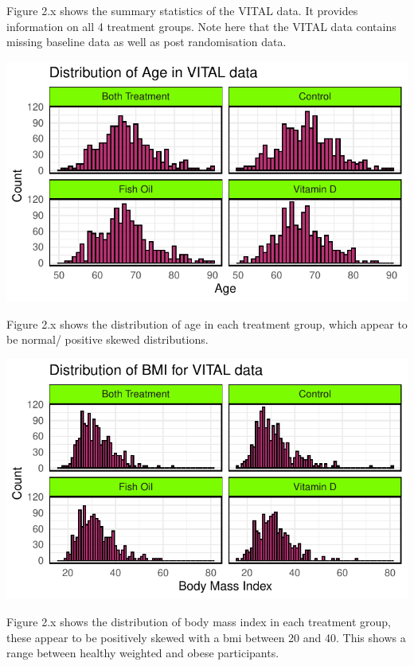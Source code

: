 \documentclass{article}
\begin{document}
Figure 2.x shows the summary statistics of the VITAL data. It provides
information on all 4 treatment groups. Note here that the VITAL data
contains missing baseline data as well as post randomisation data.

\begin{center}\includegraphics{Final_Report_files/figure-latex/unnamed-chunk-11-1} \end{center}

Figure 2.x shows the distribution of age in each treatment group, which
appear to be normal/ positive skewed distributions.

\begin{center}\includegraphics{Final_Report_files/figure-latex/unnamed-chunk-12-1} \end{center}

Figure 2.x shows the distribution of body mass index in each treatment
group, these appear to be positively skewed with a bmi between 20 and
40. This shows a range between healthy weighted and obese participants.
\end{document}
